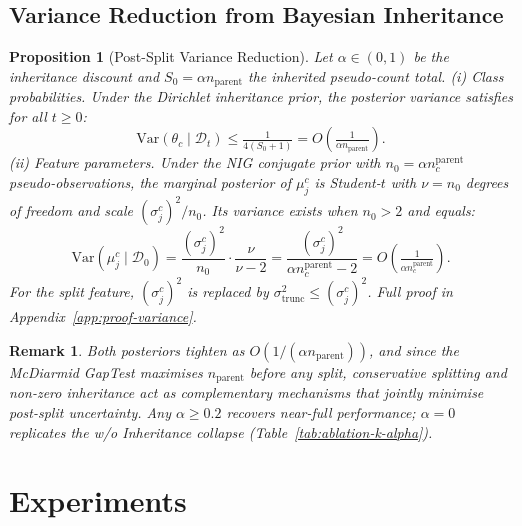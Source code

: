 \documentclass{article}
\newtheorem{proposition}[theorem]{Proposition}
\newtheorem{remark}[theorem]{Remark}
\begin{document}
\subsection{Variance Reduction from Bayesian Inheritance}
\label{sec:theory-var}
\begin{proposition}[Post-Split Variance Reduction]
\label{prop:variance}
Let $\alpha \in (0,1)$ be the inheritance discount and
$S_0 = \alpha n_{\mathrm{parent}}$ the inherited pseudo-count total.
\emph{(i) Class probabilities.}
Under the Dirichlet inheritance prior, the posterior variance satisfies
for all $t \geq 0$:
\begin{equation}
  \mathrm{Var}(\theta_c \mid \mathcal{D}_t)
  \leq \tfrac{1}{4(S_0 + 1)}
  = O\!\left(\tfrac{1}{\alpha n_{\mathrm{parent}}}\right).
\end{equation}
\emph{(ii) Feature parameters.}
Under the NIG conjugate prior with $n_0 = \alpha n_c^{\mathrm{parent}}$
pseudo-observations, the marginal posterior of $\mu_j^c$ is
Student-$t$ with $\nu = n_0$ degrees of freedom and scale
$(\sigma_j^c)^2/n_0$. Its variance exists when $n_0 > 2$ and equals:
\begin{equation}
  \mathrm{Var}(\mu_j^c \mid \mathcal{D}_0)
  = \frac{(\sigma_j^c)^2}{n_0} \cdot \frac{\nu}{\nu - 2}
  = \frac{(\sigma_j^c)^2}{\alpha n_c^{\mathrm{parent}} - 2}
  = O\!\left(\tfrac{1}{\alpha n_c^{\mathrm{parent}}}\right).
\end{equation}
For the split feature, $(\sigma_j^c)^2$ is replaced by
$\sigma_{\mathrm{trunc}}^2 \leq (\sigma_j^c)^2$.
Full proof in Appendix~\ref{app:proof-variance}.
\end{proposition}

\begin{remark}
Both posteriors tighten as $O(1/(\alpha n_{\mathrm{parent}}))$, and
since the McDiarmid GapTest maximises $n_{\mathrm{parent}}$ before any
split, conservative splitting and non-zero inheritance act as
complementary mechanisms that jointly minimise post-split uncertainty.
Any $\alpha \geq 0.2$ recovers near-full performance; $\alpha = 0$
replicates the \emph{w/o Inheritance} collapse (Table~\ref{tab:ablation-k-alpha}).
\end{remark}
\section{Experiments}
\label{sec:experiments}
\end{document}
